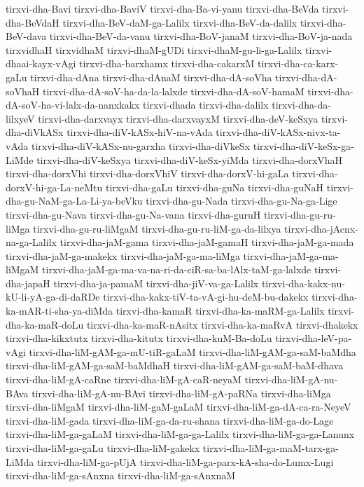 {tirxvi-dha-Bavi
tirxvi-dha-BaviV
tirxvi-dha-Ba-vi-yanu
tirxvi-dha-BeVda
tirxvi-dha-BeVdaH
tirxvi-dha-BeV-daM-ga-Lalilx
tirxvi-dha-BeV-da-dalilx
tirxvi-dha-BeV-dava
tirxvi-dha-BeV-da-vanu
tirxvi-dha-BoV-janaM
tirxvi-dha-BoV-ja-nada
tirxvidhaH
tirxvidhaM
tirxvi-dhaM-gUDi
tirxvi-dhaM-gu-li-ga-Lalilx
tirxvi-dhaai-kayx-vAgi
tirxvi-dha-barxhamx
tirxvi-dha-cakarxM
tirxvi-dha-ca-karx-gaLu
tirxvi-dha-dAna
tirxvi-dha-dAnaM
tirxvi-dha-dA-soVha
tirxvi-dha-dA-soVhaH
tirxvi-dha-dA-soV-ha-da-la-lalxde
tirxvi-dha-dA-soV-hamaM
tirxvi-dha-dA-soV-ha-vi-lalx-da-nanxkakx
tirxvi-dhada
tirxvi-dha-dalilx
tirxvi-dha-da-lilxyeV
tirxvi-dha-darxvayx
tirxvi-dha-darxvayxM
tirxvi-dha-deV-keSxya
tirxvi-dha-diVkASx
tirxvi-dha-diV-kASx-hiV-na-vAda
tirxvi-dha-diV-kASx-nivx-ta-vAda
tirxvi-dha-diV-kASx-nu-garxha
tirxvi-dha-diVkeSx
tirxvi-dha-diV-keSx-ga-LiMde
tirxvi-dha-diV-keSxya
tirxvi-dha-diV-keSx-yiMda
tirxvi-dha-dorxVhaH
tirxvi-dha-dorxVhi
tirxvi-dha-dorxVhiV
tirxvi-dha-dorxV-hi-gaLa
tirxvi-dha-dorxV-hi-ga-La-neMtu
tirxvi-dha-gaLu
tirxvi-dha-guNa
tirxvi-dha-guNaH
tirxvi-dha-gu-NaM-ga-La-Li-ya-beVku
tirxvi-dha-gu-Nada
tirxvi-dha-gu-Na-ga-Lige
tirxvi-dha-gu-Nava
tirxvi-dha-gu-Na-vana
tirxvi-dha-guruH
tirxvi-dha-gu-ru-liMga
tirxvi-dha-gu-ru-liMgaM
tirxvi-dha-gu-ru-liM-ga-da-lilxya
tirxvi-dha-jAcnx-na-ga-Lalilx
tirxvi-dha-jaM-gama
tirxvi-dha-jaM-gamaH
tirxvi-dha-jaM-ga-mada
tirxvi-dha-jaM-ga-makekx
tirxvi-dha-jaM-ga-ma-liMga
tirxvi-dha-jaM-ga-ma-liMgaM
tirxvi-dha-jaM-ga-ma-va-na-ri-da-ciR-sa-ba-lAlx-taM-ga-lalxde
tirxvi-dha-japaH
tirxvi-dha-ja-pamaM
tirxvi-dha-jiV-va-ga-Lalilx
tirxvi-dha-kakx-nu-kU-li-yA-ga-di-daRDe
tirxvi-dha-kakx-tiV-ta-vA-gi-hu-deM-bu-dakekx
tirxvi-dha-ka-mAR-ti-sha-ya-diMda
tirxvi-dha-kamaR
tirxvi-dha-ka-maRM-ga-Lalilx
tirxvi-dha-ka-maR-doLu
tirxvi-dha-ka-maR-nAsitx
tirxvi-dha-ka-maRvA
tirxvi-dhakekx
tirxvi-dha-kikxtutx
tirxvi-dha-kitutx
tirxvi-dha-kuM-Ba-doLu
tirxvi-dha-leV-pa-vAgi
tirxvi-dha-liM-gAM-ga-mU-tiR-gaLaM
tirxvi-dha-liM-gAM-ga-saM-baMdha
tirxvi-dha-liM-gAM-ga-saM-baMdhaH
tirxvi-dha-liM-gAM-ga-saM-baM-dhava
tirxvi-dha-liM-gA-caRne
tirxvi-dha-liM-gA-caR-neyaM
tirxvi-dha-liM-gA-nu-BAva
tirxvi-dha-liM-gA-nu-BAvi
tirxvi-dha-liM-gA-paRNa
tirxvi-dha-liMga
tirxvi-dha-liMgaM
tirxvi-dha-liM-gaM-gaLaM
tirxvi-dha-liM-ga-dA-ca-ra-NeyeV
tirxvi-dha-liM-gada
tirxvi-dha-liM-ga-da-ru-shana
tirxvi-dha-liM-ga-do-Lage
tirxvi-dha-liM-ga-gaLaM
tirxvi-dha-liM-ga-ga-Lalilx
tirxvi-dha-liM-ga-ga-Lanunx
tirxvi-dha-liM-ga-gaLu
tirxvi-dha-liM-gakekx
tirxvi-dha-liM-ga-maM-tarx-ga-LiMda
tirxvi-dha-liM-ga-pUjA
tirxvi-dha-liM-ga-parx-kA-sha-do-Lumx-Lugi
tirxvi-dha-liM-ga-sAnxna
tirxvi-dha-liM-ga-sAnxnaM
}
